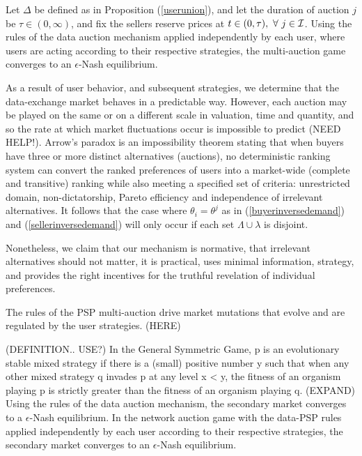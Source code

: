 {
Let $\Delta$ be defined as in Proposition (\ref{userunion}), and
let the duration of auction $j$ be $\tau \in (0,\infty)$, and fix the
sellers reserve prices at $t\in(0,\tau), \ \forall \ j\in\mathcal{I}$.
Using the rules of the data auction mechanism applied independently by each
user, where users are acting according to their respective strategies, the multi-auction game converges to an $\epsilon$-Nash equilibrium. 
}\\

As a result of user behavior, and subsequent strategies, we determine that the
data-exchange market behaves in a predictable way. However,
each auction may be played on the same or on a different scale in
valuation, time and quantity, and so the rate at which market fluctuations occur is
impossible to predict (NEED HELP!). 
Arrow's paradox is an impossibility theorem stating that when buyers have three
or more distinct alternatives (auctions), no deterministic ranking system can
convert the ranked preferences of users into a market-wide (complete
and transitive) ranking while also meeting a specified set of criteria:
unrestricted domain, non-dictatorship, Pareto efficiency and independence of
irrelevant alternatives. It follows that the case where
$\theta_i = \theta^j$ as in (\ref{buyerinversedemand}) and
(\ref{sellerinversedemand}) will only occur if each set $\Lambda \cup \lambda$
is disjoint.

Nonetheless, we claim that our mechanism is normative, that irrelevant
alternatives should not matter, it is practical, uses minimal information,
strategy, and provides the right incentives for the truthful revelation of individual preferences. 

The rules of the PSP
multi-auction drive market mutations that evolve and are regulated by the user
strategies.
(HERE)

(DEFINITION.. USE?)
In the General Symmetric Game, p is an evolutionary stable mixed strategy if
there is a (small) positive number y such that when any other mixed strategy q
invades p at any level x < y, the fitness of an organism playing p is strictly
greater than the fitness of an organism playing q.
(EXPAND)
{
Using the rules of the data auction mechanism, the secondary market
converges to a $\epsilon$-Nash equilibrium. In the network auction
game with the data-PSP rules applied independently by each user according to their respective strategies, the secondary market converges to an $\epsilon$-Nash
equilibrium. 
}\\


